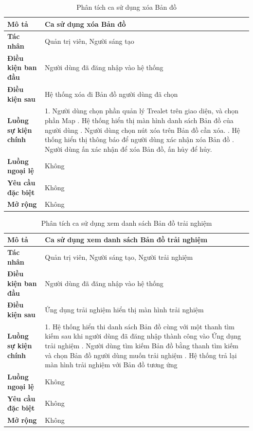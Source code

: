 \begin{table}
\centering
\caption{Phân tích ca sử dụng xóa Bản đồ}
\begin{tabular}{|p{4cm}|p{10cm}|}
    \hline
\textbf{Mô tả} & Ca sử dụng xóa Bản đồ \\ \hline
\textbf{Tác nhân} & Quản trị viên, Người sáng tạo \\ \hline
\textbf{Điều kiện ban đầu} & Người dùng đã đăng nhập vào hệ thống \\ \hline
\textbf{Điều kiện sau} & Hệ thống xóa đi Bản đồ người dùng đã chọn \\ \hline
\textbf{Luồng sự kiện chính} & 
1. Người dùng chọn phần quản lý
Trealet trên giao diện, và chọn
phần Map \newline
2. Hệ thống hiển thị màn hình danh
sách Bản đồ của người dùng \newline
3. Người dùng chọn nút xóa trên
Bản đồ cần xóa. \newline
4. Hệ thống hiển thị thông báo để
người dùng xác nhận xóa Bản đồ \newline
5. Người dùng ấn xác nhận để xóa
Bản đồ, ấn hủy để hủy. \\ \hline
\textbf{Luồng ngoại lệ} & Không \\ \hline
\textbf{Yêu cầu đặc biệt} & Không \\ \hline
\textbf{Mở rộng} & Không \\ \hline
\end{tabular}
\end{table}
\begin{table}
\centering
\caption{Phân tích ca sử dụng xem danh sách Bản đồ trải nghiệm}
\begin{tabular}{|p{4cm}|p{10cm}|}
    \hline
\textbf{Mô tả} & Ca sử dụng xem danh sách Bản đồ trải nghiệm \\ \hline
\textbf{Tác nhân} & Quản trị viên, Người sáng tạo, Người trải nghiệm \\ \hline
\textbf{Điều kiện ban đầu} & Người dùng đã đăng nhập vào hệ thống \\ \hline
\textbf{Điều kiện sau} & Ứng dụng trải nghiệm hiển thị màn hình trải nghiệm \\ \hline
\textbf{Luồng sự kiện chính} & 
1. Hệ thống hiển thi danh sách Bản đồ
cùng với một thanh tìm kiếm sau
khi người dùng đã đăng nhập
thành công vào Ứng dụng trải
nghiệm \newline
2. Người dùng tìm kiếm Bản đồ bằng
thanh tìm kiếm và chọn Bản đồ
người dùng muốn trải nghiệm \newline
3. Hệ thống trả lại màn hình trải
nghiệm với Bản đồ tương ứng \\ \hline
\textbf{Luồng ngoại lệ} & Không \\ \hline
\textbf{Yêu cầu đặc biệt} & Không \\ \hline
\textbf{Mở rộng} & Không \\ \hline
\end{tabular}
\end{table}
